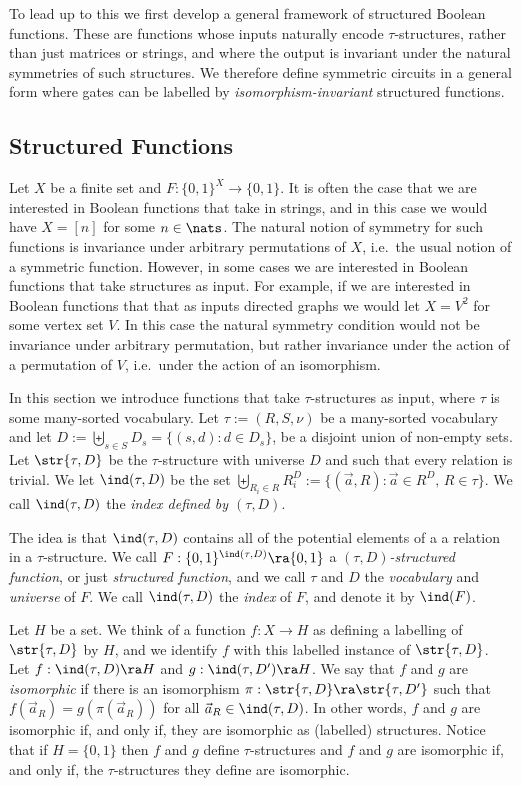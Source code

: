 \documentclass[a4paper,UKenglish]{lipics-v2018}
\begin{document}
To lead up to this we first develop a general framework of structured Boolean
functions. These are functions whose inputs naturally encode $\tau$-structures,
rather than just matrices or strings, and where the output is invariant under
the natural symmetries of such structures. We therefore define symmetric
circuits in a general form where gates can be labelled by
\emph{isomorphism-invariant} structured functions.

\subsection{Structured Functions}
Let $X$ be a finite set and $F: \{0,1\}^X \rightarrow \{0,1\}$. It is often the
case that we are interested in Boolean functions that take in strings, and in
this case we would have $X = [n]$ for some $n \in \nats$. The natural notion of
symmetry for such functions is invariance under arbitrary permutations of $X$,
i.e.\ the usual notion of a symmetric function. However, in some cases we are
interested in Boolean functions that take structures as input. For example, if
we are interested in Boolean functions that that as inputs directed graphs we
would let $X = V^2$ for some vertex set $V$. In this case the natural symmetry
condition would not be invariance under arbitrary permutation, but rather
invariance under the action of a permutation of $V$, i.e.\ under the action of
an isomorphism.

In this section we introduce functions that take $\tau$-structures as input,
where $\tau$ is some many-sorted vocabulary. Let $\tau := (R, S, \nu)$ be a
many-sorted vocabulary and let $D := \biguplus_{s \in S} D_{s} = \{(s,d) : d \in
D_s\}$, be a disjoint union of non-empty sets. Let $\str{\tau, D}$ be the
$\tau$-structure with universe $D$ and such that every relation is trivial. We
let $\ind (\tau, D)$ be the set $\biguplus_{R_i\in R} R^{D}_i := \{ (\vec{a}, R)
: \vec{a} \in R^{D}, \, R \in \tau \} $. We call $\ind(\tau, D)$ the \emph{index
  defined by $(\tau, D)$}.

The idea is that $\ind(\tau, D)$ contains all of the potential elements of a a
relation in a $\tau$-structure. We call $F : \{0,1\}^{\ind(\tau, D)} \ra
\{0,1\}$ a \emph{$(\tau, D)$-structured function}, or just \emph{structured
  function}, and we call $\tau$ and $D$ the \emph{vocabulary} and
\emph{universe} of $F$. We call $\ind(\tau, D)$ the \emph{index} of $F$, and
denote it by $\ind(F)$.

Let $H$ be a set. We think of a function $f : X \rightarrow H$ as defining a
labelling of $\str{\tau,D}$ by $H$, and we identify $f$ with this labelled
instance of $\str{\tau, D}$. Let $f: \ind(\tau, D) \ra H$ and $g : \ind (\tau,
D') \ra H$. We say that $f$ and $g$ are \emph{isomorphic} if there is an
isomorphism $\pi : \str{\tau, D} \ra \str{\tau, D'}$ such that $f(\vec{a}_R) =
g(\pi(\vec{a}_R))$ for all $\vec{a}_R \in \ind(\tau, D)$. In other words, $f$
and $g$ are isomorphic if, and only if, they are isomorphic as (labelled)
structures. Notice that if $H = \{0,1\}$ then $f$ and $g$ define
$\tau$-structures and $f$ and $g$ are isomorphic if, and only if, the
$\tau$-structures they define are isomorphic.
\end{document}

